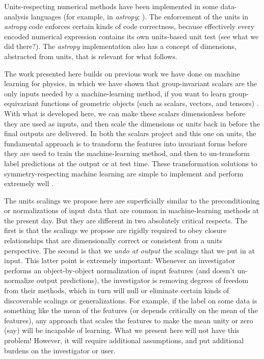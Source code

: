 \documentclass[12pt, letterpaper]{article}
\newcommand{\project}[1]{\textsl{#1}}
\newcommand{\astropy}{\project{astropy}}
\begin{document}
Units-respecting numerical methods have been implemented in some data-analysis languages (for example, in \astropy; \cite{astropy}).
The enforcement of the units in \astropy{} code enforces certain kinds of code correctness, because effectively every encoded numerical expression contains its own units-based unit test (see what we did there?).
The \astropy{} implementation also has a concept of dimensions, abstracted from units, that is relevant for what follows.

The work presented here builds on previous work we have done on machine learning for physics, in which we have shown that group-invariant scalars are the only inputs needed by a machine-learning method, if you want to learn group-equivariant functions of geometric objects (such as scalars, vectors, and tensors) \cite{villar, yao}.
With what is developed here, we can make these scalars dimensionless before they are used as inputs, and then scale the dimensions or units back in before the final outputs are delivered.
In both the scalars project and this one on units, the fundamental approach is to transform the features into invariant forms before they are used to train the machine-learning method, and then to un-transform label predictions at the output or at test time.
These transformation solutions to symmetry-respecting machine learning are simple to implement and perform extremely well \cite{yao}.

The units scalings we propose here are superficially similar to the preconditioning or normalizations of input data that are common in machine-learning methods at the present day.
But they are different in two absolutely critical respects.
The first is that the scalings we propose are rigidly required to obey closure relationships that are dimensionally correct or consistent from a units perspective.
The second is that we \emph{undo at output} the scalings that we put in at input.
This latter point is extremely important:
Whenever an investigator performs an object-by-object normalization of input features (and doesn't un-normalize output predictions), the investigator is removing degrees of freedom from their methods, which in turn will null or eliminate certain kinds of discoverable scalings or generalizations.
For example, if the label on some data is something like the mean of the features (or depends critically on the mean of the features), any approach that scales the features to make the mean unity or zero (say) will be incapable of learning.
What we present here will not have this problem!
However, it will require additional assumptions, and put additional burdens on the investigator or user.
\end{document}
